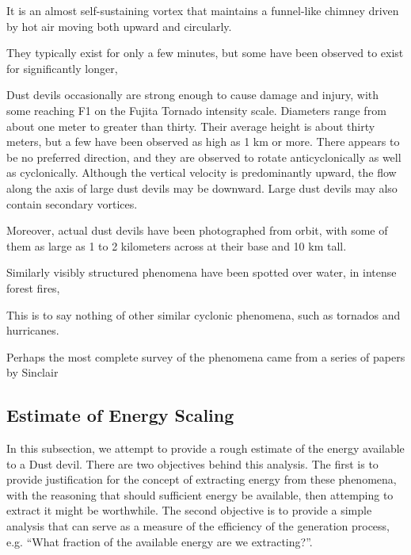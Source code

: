 It is an almost self-sustaining vortex that maintains a funnel-like
chimney driven by hot air moving both upward and circularly. 


They typically exist for only a few minutes, but some have been observed
to exist for significantly longer, 

%
%
Dust devils occasionally are strong enough to cause damage and injury,
with some reaching F1 on the Fujita Tornado intensity scale. 
%
%
Diameters range from about one meter to greater than thirty.  Their
average height is about thirty meters, but a few have been observed 
as high as 1 km or more. There appears to be no preferred direction, and
they are observed to rotate anticyclonically as well as
cyclonically. Although the vertical velocity 
is predominantly upward, the flow along the axis of large dust devils
may be downward. Large dust devils may also contain secondary vortices. 

%
%
 
Moreover, actual dust devils have been photographed from orbit, with
some of them as large as 1 to 2 kilometers across at their base and 10
km tall. 

Similarly visibly structured phenomena have been spotted over water, in
intense forest fires, 

%
%
This is to say nothing of other similar cyclonic phenomena, such as
tornados and hurricanes. 


Perhaps the most complete survey of the phenomena came from a series of
papers by Sinclair

\subsection{Estimate of Energy Scaling}

In this subsection, we attempt to provide a rough estimate of the energy
available to a Dust devil. There are two objectives behind this
analysis. The first is to provide justification for the concept of
extracting energy from these phenomena, with the reasoning that should
sufficient energy be available, then attemping to extract it might be
worthwhile. The second objective is to provide a simple analysis that
can serve as a measure of the efficiency of the generation process,
e.g. ``What fraction of the available energy are we extracting?''.  

